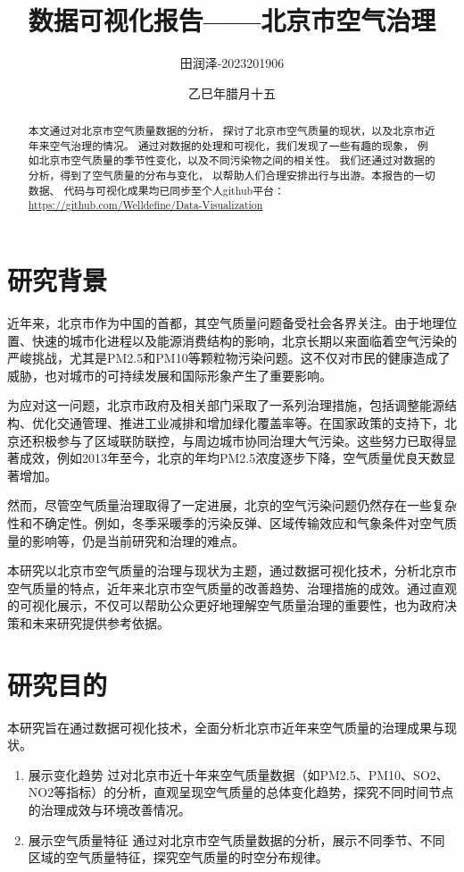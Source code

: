 \documentclass[12pt, a4paper, oneside]{ctexart}
\title{\textbf{数据可视化报告——北京市空气治理}}
\author{田润泽-2023201906}
\date{乙巳年腊月十五}
\begin{document}
\maketitle
\begin{abstract}
    本文通过对北京市空气质量数据的分析，
    探讨了北京市空气质量的现状，以及北京市近年来空气治理的情况。
    通过对数据的处理和可视化，我们发现了一些有趣的现象，
    例如北京市空气质量的季节性变化，以及不同污染物之间的相关性。
    我们还通过对数据的分析，得到了空气质量的分布与变化，
    以帮助人们合理安排出行与出游。本报告的一切数据、
    代码与可视化成果均已同步至个人github平台：
    \url{https://github.com/Welldefine/Data-Visualization}
\end{abstract}

\section{研究背景}
近年来，北京市作为中国的首都，其空气质量问题备受社会各界关注。由于地理位置、快速的城市化进程以及能源消费结构的影响，北京长期以来面临着空气污染的严峻挑战，尤其是PM2.5和PM10等颗粒物污染问题。这不仅对市民的健康造成了威胁，也对城市的可持续发展和国际形象产生了重要影响。

为应对这一问题，北京市政府及相关部门采取了一系列治理措施，包括调整能源结构、优化交通管理、推进工业减排和增加绿化覆盖率等。在国家政策的支持下，北京还积极参与了区域联防联控，与周边城市协同治理大气污染。这些努力已取得显著成效，例如2013年至今，北京的年均PM2.5浓度逐步下降，空气质量优良天数显著增加。

然而，尽管空气质量治理取得了一定进展，北京的空气污染问题仍然存在一些复杂性和不确定性。例如，冬季采暖季的污染反弹、区域传输效应和气象条件对空气质量的影响等，仍是当前研究和治理的难点。

本研究以北京市空气质量的治理与现状为主题，通过数据可视化技术，分析北京市空气质量的特点，近年来北京市空气质量的改善趋势、治理措施的成效。通过直观的可视化展示，不仅可以帮助公众更好地理解空气质量治理的重要性，也为政府决策和未来研究提供参考依据。
\section{研究目的}
本研究旨在通过数据可视化技术，全面分析北京市近年来空气质量的治理成果与现状。
\begin{enumerate}
    \item 展示变化趋势
    过对北京市近十年来空气质量数据（如PM2.5、PM10、SO2、NO2等指标）的分析，直观呈现空气质量的总体变化趋势，探究不同时间节点的治理成效与环境改善情况。
    \item 展示空气质量特征
    通过对北京市空气质量数据的分析，展示不同季节、不同区域的空气质量特征，探究空气质量的时空分布规律。
\end{enumerate}
\end{document}
